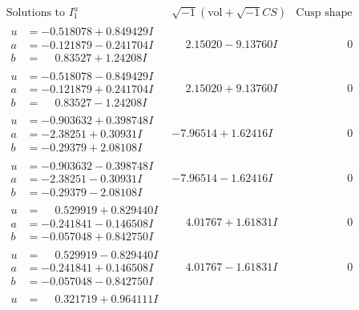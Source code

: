 \documentclass[1p]{elsarticle_modified}
\theoremstyle{definition}
\newcommand{\I}{\sqrt{-1}}
\begin{document}
$$\begin{array}{c|c|c}  
\text{Solutions to }I^u_{1}& \I (\text{vol} + \sqrt{-1}CS) & \text{Cusp shape}\\
 \hline 
\begin{aligned}
u &= -0.518078 + 0.849429 I \\
a &= -0.121879 - 0.241704 I \\
b &= \phantom{-}0.83527 + 1.24208 I\end{aligned}
 & \phantom{-}2.15020 - 9.13760 I & \phantom{-0.000000 } 0 \\ \hline\begin{aligned}
u &= -0.518078 - 0.849429 I \\
a &= -0.121879 + 0.241704 I \\
b &= \phantom{-}0.83527 - 1.24208 I\end{aligned}
 & \phantom{-}2.15020 + 9.13760 I & \phantom{-0.000000 } 0 \\ \hline\begin{aligned}
u &= -0.903632 + 0.398748 I \\
a &= -2.38251 + 0.30931 I \\
b &= -0.29379 + 2.08108 I\end{aligned}
 & -7.96514 + 1.62416 I & \phantom{-0.000000 } 0 \\ \hline\begin{aligned}
u &= -0.903632 - 0.398748 I \\
a &= -2.38251 - 0.30931 I \\
b &= -0.29379 - 2.08108 I\end{aligned}
 & -7.96514 - 1.62416 I & \phantom{-0.000000 } 0 \\ \hline\begin{aligned}
u &= \phantom{-}0.529919 + 0.829440 I \\
a &= -0.241841 - 0.146508 I \\
b &= -0.057048 + 0.842750 I\end{aligned}
 & \phantom{-}4.01767 + 1.61831 I & \phantom{-0.000000 } 0 \\ \hline\begin{aligned}
u &= \phantom{-}0.529919 - 0.829440 I \\
a &= -0.241841 + 0.146508 I \\
b &= -0.057048 - 0.842750 I\end{aligned}
 & \phantom{-}4.01767 - 1.61831 I & \phantom{-0.000000 } 0 \\ \hline\begin{aligned}
u &= \phantom{-}0.321719 + 0.964111 I \\

\end{aligned}
\end{array}$$
\end{document}
